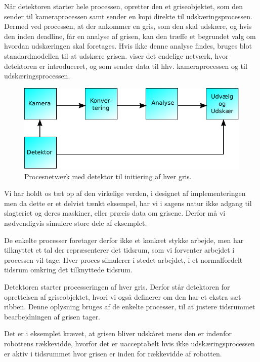 Når detektoren starter hele processen, opretter den et griseobjektet, som den sender til kameraprocessen samt sender en kopi direkte til udskæringsprocessen. Dermed ved processen, at der ankommer en gris, som den skal udskære, og hvis den inden deadline, får en analyse af grisen, kan den træffe et begrundet valg om hvordan udskæringen skal foretages. Hvis ikke denne analyse findes, bruges blot standardmodellen til at udskære grisen.  viser det endelige  netværk, hvor detektoren er introduceret, og som sender data til hhv. kameraprocessen og til udskæringsprocessen. 

\begin{figure}
 \begin{center}
  \includegraphics[scale=1]{images/pig-network2}
	\caption{Procesnetværk med detektor til initiering af hver gris.}
	\label{fig:pig-network2}
\end{center}
\end{figure}

Vi har holdt os tæt op af den virkelige verden, i designet af implementeringen men da dette er et delvist tænkt eksempel, har vi i  sagens natur ikke  adgang til slagteriet og deres maskiner, eller præcis data om grisene. Derfor må vi nødvendigvis simulere store dele af eksemplet. 

De enkelte processer foretager derfor ikke et konkret stykke arbejde, men har  tilknyttet et tal der repræsenterer det tidsrum, som vi forventer arbejdet i processen vil tage. Hver proces simulerer i stedet arbejdet, i et normalfordelt tidsrum omkring det tilknyttede tidsrum.

Detektoren starter processeringen af hver gris. Derfor står detektoren for oprettelsen af griseobjektet, hvori vi også  definerer om den har et ekstra sæt ribben. Denne oplysning bruges af de enkelte processer, til at justere tidsrummet bearbejdningen af grisen tager. 

Det er i eksemplet  krævet, at grisen bliver udskåret mens den er indenfor robottens rækkevidde, hvorfor det er uacceptabelt hvis ikke udskæringsprocessen er aktiv i tidsrummet hvor grisen er inden for rækkevidde af robotten. 

